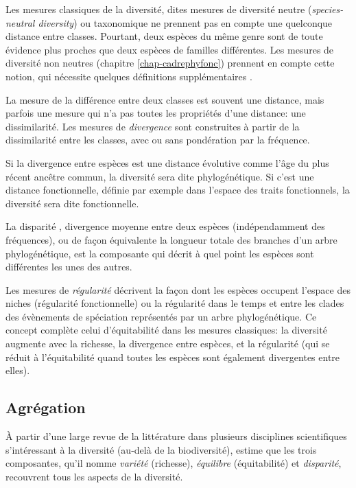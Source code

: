 \documentclass[
  11pt,
  american,
  a4paper,
  extrafontsizes,onecolumn,openright
  ]{memoir}
\newlength{\rf}
\begin{document}
Les mesures classiques de la diversité, dites mesures de diversité neutre (\emph{species-neutral diversity}) ou taxonomique ne prennent pas en compte une quelconque distance entre classes.
Pourtant, deux espèces du même genre sont de toute évidence plus proches que deux espèces de familles différentes.
Les mesures de diversité non neutres (chapitre \ref{chap-cadrephyfonc}) prennent en compte cette notion, qui nécessite quelques définitions supplémentaires \autocite{Mouillot2005,Ricotta2007}.

La mesure de la différence entre deux classes est souvent une distance, mais parfois une mesure qui n'a pas toutes les propriétés d'une distance: une dissimilarité.
Les mesures de \emph{divergence} \autocite{Pavoine2011} sont construites à partir de la dissimilarité entre les classes, avec ou sans pondération par la fréquence.

Si la divergence entre espèces est une distance évolutive comme l'âge du plus récent ancêtre commun, la diversité sera dite phylogénétique.
Si c'est une distance fonctionnelle, définie par exemple dans l'espace des traits fonctionnels, la diversité sera dite fonctionnelle.

La disparité \autocite{Runnegar1987}, divergence moyenne entre deux espèces (indépendamment des fréquences), ou de façon équivalente la longueur totale des branches d'un arbre phylogénétique, est la composante qui décrit à quel point les espèces sont différentes les unes des autres.

Les mesures de \emph{régularité} décrivent la façon dont les espèces occupent l'espace des niches (régularité fonctionnelle) ou la régularité dans le temps et entre les clades des évènements de spéciation représentés par un arbre phylogénétique.
Ce concept complète celui d'équitabilité dans les mesures classiques: la diversité augmente avec la richesse, la divergence entre espèces, et la régularité (qui se réduit à l'équitabilité quand toutes les espèces sont également divergentes entre elles).

\hypertarget{agruxe9gation}{%
\subsection{Agrégation}\label{agruxe9gation}}

À partir d'une large revue de la littérature dans plusieurs disciplines scientifiques s'intéressant à la diversité (au-delà de la biodiversité), \textcite{Stirling2007} estime que les trois composantes, qu'il nomme \emph{variété} (richesse), \emph{équilibre} (équitabilité) et \emph{disparité}, recouvrent tous les aspects de la diversité.
\end{document}
